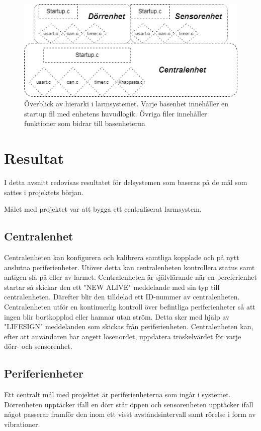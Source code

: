 \documentclass{article}
\begin{document}
\begin{figure}[h]
    \centering
    \includegraphics[scale=0.5]{Projektrapport/hierarki.png}
    \caption {Överblick av hierarki i larmsystemet. Varje basenhet innehåller en startup fil med enhetens huvudlogik. Övriga filer innehåller funktioner som bidrar till basenheterna}
    \label{fig:drawing}
\end{figure}


\section{Resultat}
I detta avsnitt redovisas resultatet för delsystemen som baseras på de mål som sattes i projektets början.

Målet med projektet var att bygga ett centraliserat larmsystem.
\subsection{Centralenhet}
Centralenheten kan konfigurera och kalibrera samtliga kopplade och på nytt anslutna periferienheter.
Utöver detta kan centralenheten kontrollera status samt antigen slå på eller av larmet. 
Centralenheten är självlärande när en pereferienhet startar så skickar den ett "NEW ALIVE" meddelande med sin typ till centralenheten. 
Därefter blir den tilldelad ett ID-nummer av centralenheten. 
Centralenheten utför en kontinuerlig kontroll över befintliga periferienheter så att ingen blir bortkopplad eller hamnar utan ström. 
Detta sker med hjälp av "LIFESIGN" meddelanden som skickas från periferienheten. 
Centralenheten kan, efter att användaren har angett lösenordet, uppdatera tröskelvärdet för varje dörr- och sensorenhet. 

\subsection{Periferienheter}
Ett centralt mål med projektet är periferienheterna som ingår i systemet. 
Dörrenheten upptäcker ifall en dörr står öppen och sensorenheten upptäcker ifall något passerar framför den inom ett visst avståndsintervall samt rörelse i form av vibrationer.
\end{document}
